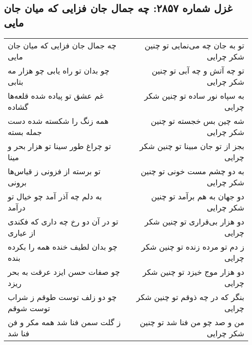 \begin{center}
\section*{غزل شماره ۲۸۵۷: چه جمال جان فزایی که میان جان مایی}
\label{sec:2857}
\begin{longtable}{l p{0.5cm} r}
چه جمال جان فزایی که میان جان مایی
&&
تو به جان چه می‌نمایی تو چنین شکر چرایی
\\
چو بدان تو راه یابی چو هزار مه بتابی
&&
تو چه آتش و چه آبی تو چنین شکر چرایی
\\
غم عشق تو پیاده شده قلعه‌ها گشاده
&&
به سپاه نور ساده تو چنین شکر چرایی
\\
همه زنگ را شکسته شده دست جمله بسته
&&
شه چین بس خجسته تو چنین شکر چرایی
\\
تو چراغ طور سینا تو هزار بحر و مینا
&&
بجز از تو جان مبینا تو چنین شکر چرایی
\\
تو برسته از فزونی ز قیاس‌ها برونی
&&
به دو چشم مست خونی تو چنین شکر چرایی
\\
به دلم چه آذر آمد چو خیال تو درآمد
&&
دو جهان به هم برآمد تو چنین شکر چرایی
\\
تو در آن دو رخ چه داری که فکندی از عیاری
&&
دو هزار بی‌قراری تو چنین شکر چرایی
\\
چو بدان لطیف خنده همه را بکرده بنده
&&
ز دم تو مرده زنده تو چنین شکر چرایی
\\
چو صفات حسن ایزد عرقت به بحر ریزد
&&
دو هزار موج خیزد تو چنین شکر چرایی
\\
چو دو زلف توست طوقم ز شراب توست شوقم
&&
بنگر که در چه ذوقم تو چنین شکر چرایی
\\
ز گلت سمن فنا شد همه مکر و فن فنا شد
&&
من و صد چو من فنا شد تو چنین شکر چرایی
\\
\end{longtable}
\end{center}

